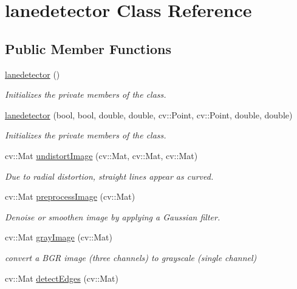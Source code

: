 \hypertarget{classlanedetector}{}\section{lanedetector Class Reference}
\label{classlanedetector}
\subsection*{Public Member Functions}
\begin{DoxyCompactItemize}
\item 
\hyperlink{classlanedetector_ac600737bb1e17700b37abdfd9bb73b06}{lanedetector} ()
\begin{DoxyCompactList}\small\item\em Initializes the private members of the class. \end{DoxyCompactList}\item 
\hyperlink{classlanedetector_a968acbf150b7e935953c340a2cf38542}{lanedetector} (bool, bool, double, double, cv\+::\+Point, cv\+::\+Point, double, double)
\begin{DoxyCompactList}\small\item\em Initializes the private members of the class. \end{DoxyCompactList}\item 
cv\+::\+Mat \hyperlink{classlanedetector_ae1c096187d507d6f3e623b9c7a471459}{undistort\+Image} (cv\+::\+Mat, cv\+::\+Mat, cv\+::\+Mat)
\begin{DoxyCompactList}\small\item\em Due to radial distortion, straight lines appear as curved. \end{DoxyCompactList}\item 
cv\+::\+Mat \hyperlink{classlanedetector_a4d92c01545c5c9713c9a70d5903ce181}{preprocess\+Image} (cv\+::\+Mat)
\begin{DoxyCompactList}\small\item\em Denoise or smoothen image by applying a Gaussian filter. \end{DoxyCompactList}\item 
cv\+::\+Mat \hyperlink{classlanedetector_a90b977cb614d19ffa5e56f1b3ef3e8c9}{gray\+Image} (cv\+::\+Mat)
\begin{DoxyCompactList}\small\item\em convert a B\+GR image (three channels) to grayscale (single channel) \end{DoxyCompactList}\item 
cv\+::\+Mat \hyperlink{classlanedetector_a8830dfaa616e20b5e15f8846fa8660eb}{detect\+Edges} (cv\+::\+Mat)

\end{DoxyCompactItemize}
